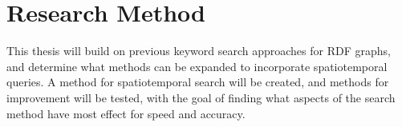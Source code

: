 \section{Research Method}
\label{sec:researchMethod}
This thesis will build on previous keyword search approaches for RDF graphs, and determine what methods can be expanded to incorporate spatiotemporal queries. A method for spatiotemporal search will be created, and methods for improvement will be tested, with the goal of finding what aspects of the search method have most effect for speed and accuracy.


\glsresetall